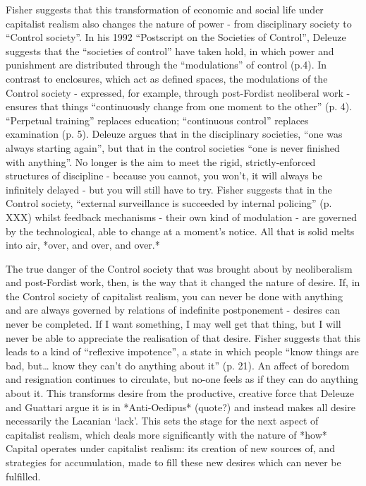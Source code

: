 Fisher suggests that this transformation of economic and social life
under capitalist realism also changes the nature of power - from
disciplinary society to ``Control society''. In his 1992 ``Postscript on
the Societies of Control'', Deleuze suggests that the ``societies of
control'' have taken hold, in which power and punishment are distributed
through the ``modulations'' of control (p.4). In contrast to enclosures,
which act as defined spaces, the modulations of the Control society -
expressed, for example, through post-Fordist neoliberal work - ensures
that things ``continuously change from one moment to the other'' (p. 4).
``Perpetual training'' replaces education; ``continuous control''
replaces examination (p. 5). Deleuze argues that in the disciplinary
societies, ``one was always starting again'', but that in the control
societies ``one is never finished with anything''. No longer is the aim
to meet the rigid, strictly-enforced structures of discipline - because
you cannot, you won't, it will always be infinitely delayed - but you
will still have to try. Fisher suggests that in the Control society,
``external surveillance is succeeded by internal policing'' (p. XXX)
whilst feedback mechanisms - their own kind of modulation - are governed
by the technological, able to change at a moment's notice. All that is
solid melts into air, *over, and over, and over.*

The true danger of the Control society that was brought about by
neoliberalism and post-Fordist work, then, is the way that it changed
the nature of desire. If, in the Control society of capitalist realism,
you can never be done with anything and are always governed by relations
of indefinite postponement - desires can never be completed. If I want
something, I may well get that thing, but I will never be able to
appreciate the realisation of that desire. Fisher suggests that this
leads to a kind of ``reflexive impotence'', a state in which people
``know things are bad, but\ldots{} know they can't do anything about
it'' (p. 21). An affect of boredom and resignation continues to
circulate, but no-one feels as if they can do anything about it. This
transforms desire from the productive, creative force that Deleuze and
Guattari argue it is in *Anti-Oedipus* (quote?) and instead makes all
desire necessarily the Lacanian `lack'. This sets the stage for the next
aspect of capitalist realism, which deals more significantly with the
nature of *how* Capital operates under capitalist realism: its creation
of new sources of, and strategies for accumulation, made to fill these
new desires which can never be fulfilled.

